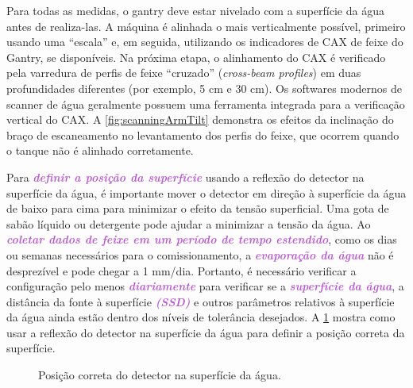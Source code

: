 \documentclass[11pt,a4paper]{article}
\newcounter{exemplo}
\begin{document}
	Para todas as medidas, o gantry deve estar nivelado com a superfície da água antes de realiza-las. A máquina é alinhada o mais verticalmente possível, primeiro usando uma ``escala'' e, em seguida, utilizando os indicadores de CAX de feixe do Gantry, se disponíveis. Na próxima etapa, o alinhamento do CAX é verificado pela varredura de perfis de feixe ``cruzado'' (\textit{cross-beam profiles}) em duas profundidades diferentes (por exemplo, 5 cm e 30 cm). Os softwares modernos de scanner de água geralmente possuem uma ferramenta integrada para a verificação vertical do CAX. A \ref{fig:scanningArmTilt} demonstra os efeitos da inclinação do braço de escaneamento no levantamento dos perfis do feixe, que ocorrem quando o tanque não é alinhado corretamente.

	

	Para \textcolor{MediumOrchid}{\textbf{\textit{definir a posição da superfície}}} usando a reflexão do detector na superfície da água, é importante mover o detector em direção à superfície da água de baixo para cima para minimizar o efeito da tensão superficial. Uma gota de sabão líquido ou detergente pode ajudar a minimizar a tensão da água. Ao \textcolor{MediumOrchid}{\textbf{\textit{coletar dados de feixe em um período de tempo estendido}}}, como os dias ou semanas necessários para o comissionamento, a \textcolor{MediumOrchid}{\textbf{\textit{evaporação da água}}} não é desprezível e pode chegar a 1 mm/dia. Portanto, é necessário verificar a configuração pelo menos \textcolor{MediumOrchid}{\textbf{\textit{diariamente}}} para verificar se a \textcolor{MediumOrchid}{\textbf{\textit{superfície da água}}}, a distância da fonte à superfície \textcolor{MediumOrchid}{\textbf{\textit{(SSD)}}} e outros parâmetros relativos à superfície da água ainda estão dentro dos níveis de tolerância desejados. A \ref{fig:posicaoDetector} mostra como usar a reflexão do detector na superfície da água para definir a posição correta da superfície.

	\begin{figure}[h]
		\centering
		\caption{Posição correta do detector na superfície da água.}
		\label{fig:posicaoDetector}
	\end{figure}
\end{document}
